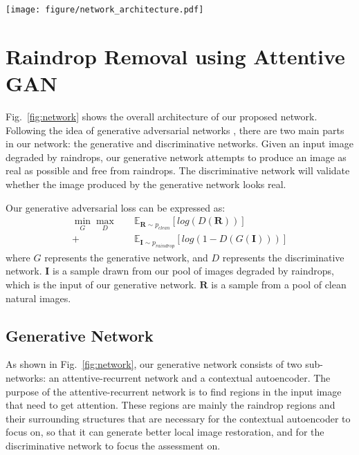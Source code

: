 \documentclass[10pt,twocolumn,letterpaper]{article}
\begin{document}
\begin{figure*}[h]
	\begin{center}
		\texttt{[image: figure/network\_architecture.pdf]}
	\end{center}
	\caption{The architecture of our proposed attentive GAN.The generator  consists of an attentive-recurrent network and a contextual autoencoder with skip connections. The discriminator is formed by a series of convolution layers and guided by the attention map. Best viewed in color.}
	\label{fig:network}
\end{figure*}

\section{Raindrop Removal using Attentive GAN}
\label{sec:our_method}

Fig.~\ref{fig:network} shows the overall architecture of our proposed network. Following the  idea of  generative adversarial networks \cite{goodfellow2014generative}, there are two main parts in our network: the generative and discriminative networks.  Given an input image degraded by raindrops, our generative network attempts to produce an image as real as possible and free from raindrops. The discriminative network will validate whether the image produced by the generative network looks real. 

Our generative adversarial loss can be expressed as:
\begin{equation}
\begin{split}
\min \limits_{G} \max \limits_{D}  & \quad \mathbb{E}_{\mathbf{R} \sim p_{clean}} [log(D(\mathbf{R}))] \\ +
 & \quad \mathbb{E}_{\mathbf{I} \sim p_{raindrop}} [log(1 - D(G(\mathbf{I})))]
\end{split}
\end{equation}
where $G$ represents the generative network, and $D$ represents the discriminative network. $\mathbf{I}$ is a sample drawn from our pool of images degraded by raindrops, which is the input of our generative network. $\mathbf{R}$ is a sample from a pool of clean natural images. 


\subsection{Generative Network}

As shown in Fig.~\ref{fig:network}, our generative network consists of two sub-networks: an attentive-recurrent network and a contextual autoencoder. The purpose of the attentive-recurrent network is to find regions in the input image that need to get attention. These regions are mainly the raindrop regions and their surrounding structures that are necessary for the contextual autoencoder to focus on, so that it can generate better local image restoration, and  for the discriminative network to focus the assessment on.
\end{document}
